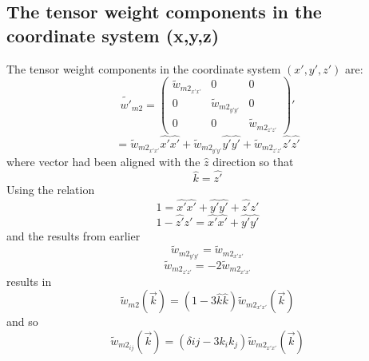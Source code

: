 \documentclass[letterpaper,twocolumn,amsmath,amssymb,prb]{revtex4-1}
\begin{document}
\begin{widetext}
\subsection{The tensor weight components in the coordinate system (x,y,z)}
The tensor weight components in the coordinate system $(x',y',z')$ are:
\begin{equation}{\widetilde{w'}_{m2}=\left(\begin{array}{ccc} \widetilde{w}_{{m2}_{x'x'}} & 0 & 0 \\ 0 & \widetilde{w}_{{m2}_{y'y'}} & 0 \\ 0 & 0 & \widetilde{w}_{{m2}_{z'z'}} \end{array}\right)'}\end{equation}
\begin{displaymath}{=\widetilde{w}_{{m2}_{x'x'}}\hat{x'}\hat{x'}+\widetilde{w}_{{m2}_{y'y'}}\hat{y'}\hat{y'}+\widetilde{w}_{{m2}_{z'z'}}\hat{z'}\hat{z'}}\end{displaymath}
where vector had been aligned with the $\hat{z}$ direction so that 
\begin{equation}{\hat{k}=\hat{z'}}\end{equation}
Using the relation
\begin{displaymath}{1 = \hat{x'}\hat{x'} + \hat{y'}\hat{y'} + \hat{z'}\hat{z'}}\end{displaymath}
\begin{displaymath}{1 -\hat{z'}\hat{z'} = \hat{x'}\hat{x'} + \hat{y'}\hat{y'}}\end{displaymath}
and the results from earlier
\begin{equation}{\widetilde{w}_{{m2}_{y'y'}}=\widetilde{w}_{{m2}_{x'x'}}}\end{equation}
\begin{equation}{\widetilde{w}_{{m2}_{z'z'}}=-2\widetilde{w}_{{m2}_{x'x'}}}\end{equation}
results in
\begin{displaymath}{\widetilde{w}_{m2}(\vec{k})= (1-3\hat{k}\hat{k})\widetilde{w}_{{m2}_{x'x'}}(\vec{k})}\end{displaymath}
and so 
\begin{displaymath}{\widetilde{w}_{m2_{ij}}(\vec{k})= (\delta{ij}-3k_ik_j)\widetilde{w}_{{m2}_{x'x'}}(\vec{k})}\end{displaymath}
\[{}\]



\end{widetext}
\end{document}
